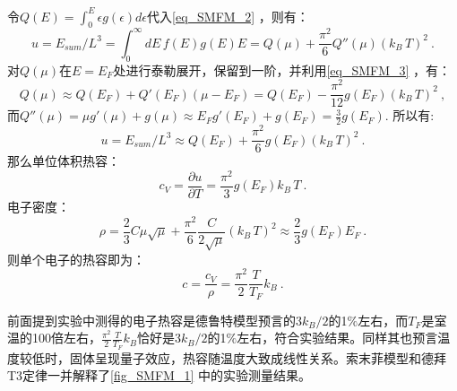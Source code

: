 令$Q(E)=\int_0^{E} \epsilon g(\epsilon)d\epsilon$代入\autoref{eq_SMFM_2} ，则有：
\begin{equation}
u=E_{sum}/L^3=\int_0^{\infty} dE\,f(E)g(E)E=Q(\mu)+\frac{\pi^2}{6}Q''(\mu)(k_B\,T)^2~.
\end{equation}
对$Q(\mu)$在$E=E_F$处进行泰勒展开，保留到一阶，并利用\autoref{eq_SMFM_3} ，有：
\begin{equation}
Q(\mu)\approx Q(E_F)+Q'(E_F)(\mu-E_F)=Q(E_F)-\frac{\pi^2}{12}g(E_F)(k_B\,T)^2~,
\end{equation}
而$Q''(\mu)=\mu g'(\mu)+g(\mu)\approx E_Fg'(E_F)+g(E_F)=\frac{3}{2}g(E_F)$.
所以有:
\begin{equation}
u=E_{sum}/L^3\approx Q(E_F)+\frac{\pi^2}{6}g(E_F)(k_B\,T)^2~.
\end{equation}
那么单位体积热容：
\begin{equation}
c_V=\frac{\partial u}{\partial T}=\frac{\pi^2}{3}g(E_F)k_B\,T~.
\end{equation}
电子密度：
\begin{equation}
\rho=\frac{2}{3}C\mu\sqrt{\mu}+\frac{\pi^2}{6}\frac{C}{2\sqrt{\mu}}(k_B\,T)^2\approx \frac{2}{3}g(E_F)E_F~.
\end{equation}
则单个电子的热容即为：
\begin{equation}
c=\frac{c_V}{\rho}=\frac{\pi^2}{2}\frac{T}{T_F}k_B~.
\end{equation}

前面提到实验中测得的电子热容是德鲁特模型预言的$3k_B/2$的1$\%$左右，而$T_F$是室温的100倍左右，$\frac{\pi^2}{2}\frac{T}{T_F}k_B$恰好是$3k_B/2$的1$\%$左右，符合实验结果。同样其也预言温度较低时，固体呈现量子效应，热容随温度大致成线性关系。索末菲模型和德拜T3定律一并解释了\autoref{fig_SMFM_1} 中的实验测量结果。
